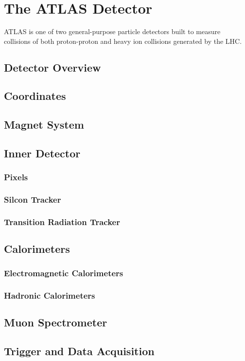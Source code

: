 \chapter{The ATLAS Detector}
ATLAS is one of two general-purpose particle detectors built to measure collisions of both proton-proton and heavy ion collisions generated by the LHC. \cite{atlas-detector-2008}
\section{Detector Overview}
\section{Coordinates}
\section{Magnet System}
\section{Inner Detector}
\subsection{Pixels}
\subsection{Silcon Tracker}
\subsection{Transition Radiation Tracker}
\section{Calorimeters}
\subsection{Electromagnetic Calorimeters}
\subsection{Hadronic Calorimeters}
\section{Muon Spectrometer}
\section{Trigger and Data Acquisition}